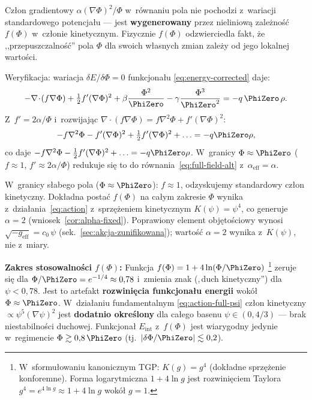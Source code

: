 \begin{remark}\label{rem:kinetic-origin}
Cz\l{}on gradientowy $\alpha(\nabla\Phi)^2/\Phi$
w~r\'ownaniu pola nie pochodzi z~wariacji standardowego
potencja\l{}u --- jest \textbf{wygenerowany} przez
nieliniow\k{a} zale\.zno\'s\'c $f(\Phi)$ w~cz\l{}onie
kinetycznym. Fizycznie $f(\Phi)$ odzwierciedla fakt,
\.ze ,,przepuszczalno\'s\'c'' pola $\Phi$ dla swoich
w\l{}asnych zmian zale\.zy od jego lokalnej warto\'sci.

Weryfikacja: wariacja $\delta E/\delta\Phi = 0$ funkcjona\l{}u
\eqref{eq:energy-corrected} daje:
\begin{equation}\label{eq:energy-functional}
  -\nabla\!\cdot\!(f\nabla\Phi) + \tfrac{1}{2}f'(\nabla\Phi)^2
  + \beta\frac{\Phi^2}{\PhiZero}
  - \gamma\frac{\Phi^3}{\PhiZero^2}
  = -q\,\PhiZero\,\rho.
\end{equation}
Z~$f' = 2\alpha/\Phi$ i~rozwijaj\k{a}c
$\nabla\!\cdot\!(f\nabla\Phi) = f\nabla^2\Phi + f'(\nabla\Phi)^2$:
\begin{equation}
  -f\nabla^2\Phi - f'(\nabla\Phi)^2 + \tfrac{1}{2}f'(\nabla\Phi)^2
  + \ldots = -q\PhiZero\rho,
\end{equation}
co daje $-f\nabla^2\Phi - \frac{1}{2}f'(\nabla\Phi)^2 + \ldots
= -q\PhiZero\rho$. W~granicy $\Phi \approx \PhiZero$
($f \approx 1$, $f' \approx 2\alpha/\Phi$) redukuje si\k{e} to do
r\'ownania~\eqref{eq:full-field-alt} z~$\alpha_{\mathrm{eff}} = \alpha$.

W~granicy s\l{}abego pola ($\Phi \approx \PhiZero$):
$f \approx 1$, odzyskujemy standardowy cz\l{}on kinetyczny.
Dok\l{}adna posta\'c $f(\Phi)$ na ca\l{}ym zakresie
$\Phi$ wynika z~dzia\l{}ania~\eqref{eq:action}
z~sprz\k{e}\.zeniem kinetycznym $K(\psi) = \psi^4$,
co generuje $\alpha = 2$ (wniosek~\ref{cor:alpha-fixed}).
Poprawiony element obj\k{e}to\'sciowy wynosi
$\sqrt{-g_{\mathrm{eff}}} = c_0\,\psi$
(sek.~\ref{sec:akcja-zunifikowana}); warto\'s\'c $\alpha=2$
wynika z~$K(\psi)$, nie z~miary.

\medskip\noindent\textbf{Zakres stosowalno\'sci $f(\Phi)$:}
Funkcja $f(\Phi) = 1 + 4\ln(\Phi/\PhiZero)$%
\footnote{W~sformu\l{}owaniu kanonicznym TGP: $K(g) = g^4$ (dok\l{}adne sprz\k{e}\.zenie konforemne). Forma logarytmiczna $1 + 4\ln g$ jest rozwini\k{e}ciem Taylora $g^4 = e^{4\ln g} \approx 1 + 4\ln g$ wok\'o\l{} $g = 1$.}
zeruje si\k{e}
dla $\Phi/\PhiZero = e^{-1/4} \approx 0{,}78$ i~zmienia znak
(,\,duch kinetyczny'') dla $\psi < 0{,}78$.
Jest to artefakt \textbf{rozwini\k{e}cia funkcjona\l{}u energii}
wok\'o\l{} $\Phi \approx \PhiZero$. W~dzia\l{}aniu fundamentalnym
\eqref{eq:action-full-psi} cz\l{}on kinetyczny $\propto \psi^5(\nabla\psi)^2$
jest \textbf{dodatnio okre\'slony} dla ca\l{}ego basenu
$\psi \in (0, 4/3)$ --- brak niestabilno\'sci duchowej.
Funkcjona\l{} $E_{\mathrm{int}}$ z~$f(\Phi)$ jest wiarygodny
jedynie w~regimencie $\Phi \gtrsim 0{,}8\,\PhiZero$
(tj.\ $|\delta\Phi/\PhiZero| \lesssim 0{,}2$).
\end{remark}

